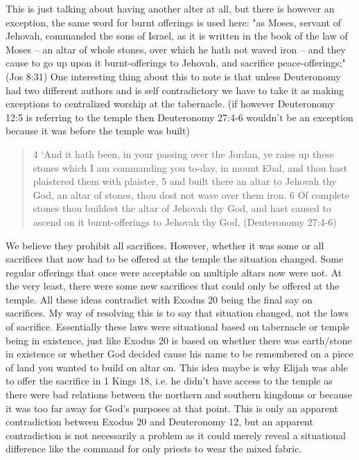 \documentclass[11pt]{article}
\begin{document}
This is just talking about having another alter at all, but there is however an exception, the same word for burnt offerings is used here:
"as Moses, servant of Jehovah, commanded the sons of Israel, as it is written in the book of the law of Moses -- an altar of whole stones, over which he hath not waved iron -- and they cause to go up upon it burnt-offerings to Jehovah, and sacrifice peace-offerings;" (Jos 8:31) One interesting thing about this to note is that unless Deuteronomy had two different authors and is self contradictory we have to take it as making exceptions to centralized worship at the tabernacle. (if however Deuteronomy 12:5 is referring to the temple then Deuteronomy 27:4-6 wouldn't be an exception because it was before the temple was built)
\begin{quote}
4 `And it hath been, in your passing over the Jordan, ye raise up these stones which I am commanding you to-day, in mount Ebal, and thou hast plaistered them with plaister,
5 and built there an altar to Jehovah thy God, an altar of stones, thou dost not wave over them iron.
6 Of complete stones thou buildest the altar of Jehovah thy God, and hast caused to ascend on it burnt-offerings to Jehovah thy God,
(Deuteronomy 27:4-6)
\end{quote}
We believe they prohibit all sacrifices. However, whether it was some or all sacrifices that now had to be offered at the temple the situation changed. Some regular offerings that once were acceptable on multiple altars now were not. At the very least, there were some new sacrifices that could only be offered at the temple. All these ideas contradict with Exodus 20 being the final say on sacrifices. My way of resolving this is to say that situation changed, not the laws of sacrifice. Essentially these laws were situational based on tabernacle or temple being in existence, just like Exodus 20 is based on whether there was earth/stone in existence or whether God decided cause his name to be remembered on a piece of land you wanted to build on altar on. This idea maybe is why Elijah was able to offer the sacrifice in 1 Kings 18, i.e. he didn't have access to the temple as there were bad relations between the northern and southern kingdoms or because it was too far away for God's purposes at that point. This is only an apparent contradiction between Exodus 20 and Deuteronomy 12, but an apparent contradiction is not necessarily a problem as it could merely reveal a situational difference like the command for only priests to wear the mixed fabric.
\end{document}
